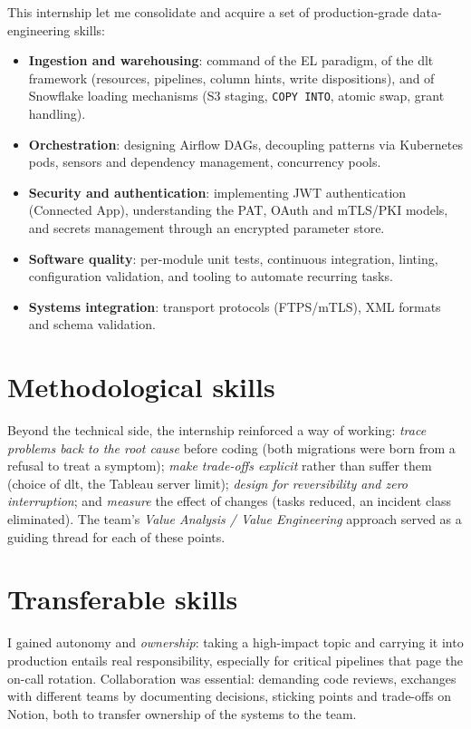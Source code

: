 This internship let me consolidate and acquire a set of production-grade data-engineering skills:

\begin{itemize}
  \item \textbf{Ingestion and warehousing}: command of the EL paradigm, of the dlt framework (resources, pipelines, column hints, write dispositions), and of Snowflake loading mechanisms (S3 staging, \texttt{COPY INTO}, atomic swap, grant handling).
  \item \textbf{Orchestration}: designing Airflow DAGs, decoupling patterns via Kubernetes pods, sensors and dependency management, concurrency pools.
  \item \textbf{Security and authentication}: implementing JWT authentication (Connected App), understanding the PAT, OAuth and mTLS/PKI models, and secrets management through an encrypted parameter store.
  \item \textbf{Software quality}: per-module unit tests, continuous integration, linting, configuration validation, and tooling to automate recurring tasks.
  \item \textbf{Systems integration}: transport protocols (FTPS/mTLS), XML formats and schema validation.
\end{itemize}

\section{Methodological skills}

Beyond the technical side, the internship reinforced a way of working: \emph{trace problems back to the root cause} before coding (both migrations were born from a refusal to treat a symptom); \emph{make trade-offs explicit} rather than suffer them (choice of dlt, the Tableau server limit); \emph{design for reversibility and zero interruption}; and \emph{measure} the effect of changes (tasks reduced, an incident class eliminated). The team's \emph{Value Analysis / Value Engineering} approach served as a guiding thread for each of these points.

\section{Transferable skills}

I gained autonomy and \emph{ownership}: taking a high-impact topic and carrying it into production entails real responsibility, especially for critical pipelines that page the on-call rotation. Collaboration was essential: demanding code reviews, exchanges with different teams by documenting decisions, sticking points and trade-offs on Notion, both to transfer ownership of the systems to the team.

